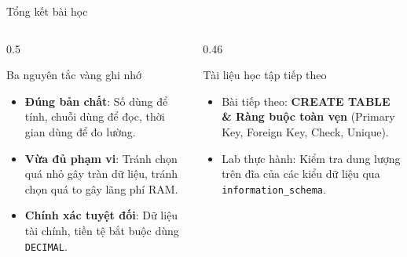 \documentclass[aspectratio=169,11pt]{beamer}
\newcommand{\kw}[1]{\textcolor{dbblue}{\textbf{#1}}}
\begin{document}
\begin{frame}{Tổng kết bài học}
\begin{columns}[t]
  \begin{column}{0.5\textwidth}
    \begin{block}{Ba nguyên tắc vàng ghi nhớ}
      \begin{itemize}\setlength{\itemsep}{2pt}
        \item \kw{Đúng bản chất}: Số dùng để tính, chuỗi dùng để đọc, thời gian dùng để đo lường.
        \item \kw{Vừa đủ phạm vi}: Tránh chọn quá nhỏ gây tràn dữ liệu, tránh chọn quá to gây lãng phí RAM.
        \item \kw{Chính xác tuyệt đối}: Dữ liệu tài chính, tiền tệ bắt buộc dùng \texttt{DECIMAL}.
      \end{itemize}
    \end{block}
  \end{column}
  \begin{column}{0.46\textwidth}
    \begin{exampleblock}{Tài liệu học tập tiếp theo}
      \begin{itemize}\setlength{\itemsep}{2pt}
        \item Bài tiếp theo: \textbf{CREATE TABLE \& Ràng buộc toàn vẹn} (Primary Key, Foreign Key, Check, Unique).
        \item Lab thực hành: Kiểm tra dung lượng trên đĩa của các kiểu dữ liệu qua \texttt{information\_schema}.
      \end{itemize}
    \end{exampleblock}
  \end{column}
\end{columns}
\end{frame}
\end{document}
